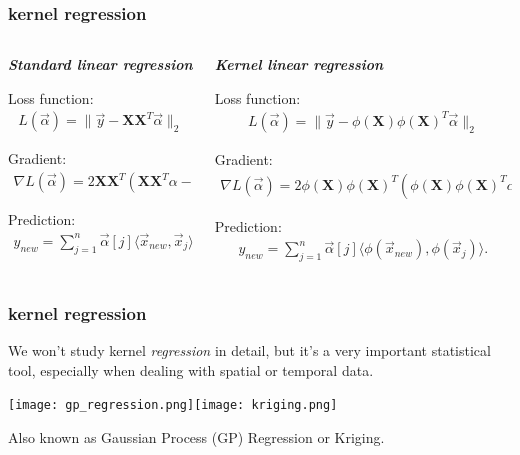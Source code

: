 \documentclass[handout,compress]{beamer}
\newcommand{\bv}[1]{\mathbf{#1}}
\begin{document}
\begin{frame} 
	\frametitle{kernel regression}
	\begin{columns}[t]
		\begin{column}{.5\textwidth}
			\emph{\textbf{Standard linear regression}}
			\vspace{1em}
			
			Loss function: 
			\begin{align*}
			L(\vec{\alpha}) = \|\vec{y}- \bv{X}\bv{X}^T\vec{\alpha}\|_2
			\end{align*}
			
			
			Gradient:
			\begin{align*}
			\nabla L(\vec{\alpha}) = 2\bv{X}\bv{X}^T(\bv{X}\bv{X}^T\alpha- \vec{y}).
			\end{align*}
			
			Prediction:
			\begin{align*}
			y_{new}  = \sum_{j=1}^n \vec{\alpha}[j] \langle\vec{x}_{new}, \vec{x}_j\rangle.
			\end{align*}
		\end{column}
		\begin{column}{.5\textwidth}
		\emph{\textbf{Kernel linear regression}}
		\vspace{1em}
	
		Loss function: 
		\begin{align*}
		L(\vec{\alpha}) = \|\vec{y}- \phi(\bv{X})\phi(\bv{X})^T\vec{\alpha}\|_2
		\end{align*}
	
	
		Gradient:
		\begin{align*}
		\nabla L(\vec{\alpha}) = 2\phi(\bv{X})\phi(\bv{X})^T(\phi(\bv{X})\phi(\bv{X})^T\alpha- \vec{y}).
		\end{align*}
	
		Prediction:
		\begin{align*}
		y_{new}  = \sum_{j=1}^n \vec{\alpha}[j] \langle\phi(\vec{x}_{new}), \phi(\vec{x}_j)\rangle.
		\end{align*}
	\end{column}
	\end{columns}
\end{frame}

\begin{frame}
	\frametitle{kernel regression}
	We won't study kernel \emph{regression} in detail, but it's a very important statistical tool, especially when dealing with spatial or temporal data.
	\begin{center}
		\texttt{[image: gp\_regression.png]}\texttt{[image: kriging.png]}
	\end{center}
Also known as Gaussian Process (GP) Regression or Kriging. 
\end{frame}
\end{document}

